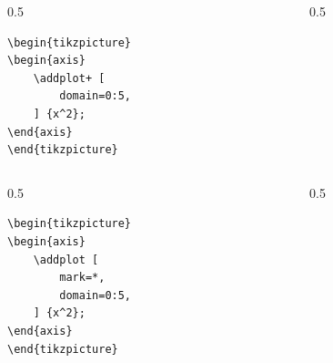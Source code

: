 \documentclass[12pt,aspectratio=169,ignorenonframetext]{ltxbeamer}
\begin{document}
\begin{frame}[fragile]
\begin{columns}
    \begin{column}{0.5\textwidth}
        \begin{verbatim}
\begin{tikzpicture}
\begin{axis}
    \addplot+ [
        domain=0:5,
    ] {x^2};
\end{axis}
\end{tikzpicture}
        \end{verbatim}
    \end{column}
    {\color{gray} \vline}
    \begin{column}{0.5\textwidth}
    \end{column}
\end{columns}
\end{frame}





\begin{frame}[fragile]
\begin{columns}
    \begin{column}{0.5\textwidth}
        \begin{verbatim}
\begin{tikzpicture}
\begin{axis}
    \addplot [
        mark=*,
        domain=0:5,
    ] {x^2};
\end{axis}
\end{tikzpicture}
        \end{verbatim}
    \end{column}
    {\color{gray} \vline}
    \begin{column}{0.5\textwidth}
    \end{column}
\end{columns}
\end{frame}
\end{document}
